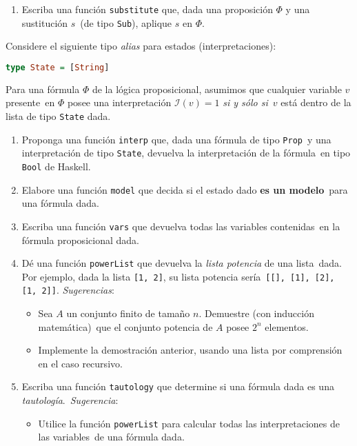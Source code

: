 \documentclass[paper=letter, fontsize=12pt]{scrartcl}
\begin{document}
\begin{enumerate}[resume]
\item Escriba una función \verb+substitute+ que, dada una proposición $\Phi$ y una sustitución $s$\
  (de tipo \verb+Sub+), aplique $s$ en $\Phi$.
\end{enumerate}

\noindent
Considere el siguiente tipo \textit{alias} para estados (interpretaciones):
\begin{lstlisting}[language=Haskell]
  type State = [String]
\end{lstlisting}
Para una fórmula $\Phi$ de la lógica proposicional, asumimos que cualquier variable $v$ presente\
en $\Phi$ posee una interpretación $\mathcal{I}(v) = 1$ \emph{si y sólo si}\
$v$ está dentro de la lista de tipo \verb+State+ dada.

\begin{enumerate}[resume]
\item Proponga una función \verb+interp+ que, dada una fórmula de tipo \verb+Prop+\
  y una interpretación de tipo \verb+State+, devuelva la interpretación de la fórmula\
  en tipo \verb+Bool+ de Haskell.
\item Elabore una función \verb+model+ que decida si el estado dado \textbf{es un modelo}\
  para una fórmula dada.
\item Escriba una función \verb+vars+ que devuelva todas las variables contenidas\
  en la fórmula proposicional dada.
\item Dé una función \verb+powerList+ que devuelva la \emph{lista potencia} de una lista\
  dada. Por ejemplo, dada la lista \verb+[1, 2]+, su lista potencia sería\
  \verb+[[], [1], [2], [1, 2]]+. \emph{Sugerencias}:
  \begin{itemize}
  \item Sea $A$ un conjunto finito de tamaño $n$. Demuestre (con inducción matemática)\
    que el conjunto potencia de $A$ posee $2^n$ elementos.
  \item Implemente la demostración anterior, usando una lista por comprensión en el caso recursivo.
  \end{itemize}
\item Escriba una función \verb+tautology+ que determine si una fórmula dada es una \emph{tautología}.\
   \emph{Sugerencia}:
   \begin{itemize}
   \item Utilice la función \verb+powerList+ para calcular todas las interpretaciones de las variables\
     de una fórmula dada.
   \end{itemize}

\end{enumerate}
\end{document}
